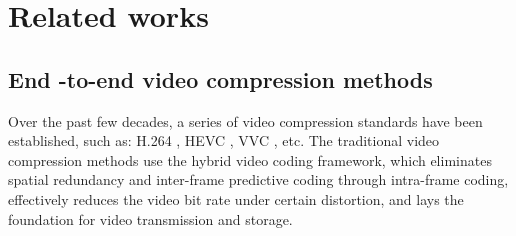 \documentclass[a4paper]{cas-sc}
\begin{document}
\section{Related works}
\subsection{End -to-end video compression methods}
Over the past few decades, a series of video compression standards have been established, 
such as: H.264 \cite{wiegand2003overview}, HEVC \cite{sullivan2012overview}, VVC \cite{bross2021overview}, etc. 
The traditional video compression methods use the hybrid video coding framework, 
which eliminates spatial redundancy and inter-frame predictive coding through intra-frame coding, 
effectively reduces the video bit rate under certain distortion, and lays the foundation for video transmission and storage. \\
\end{document}
